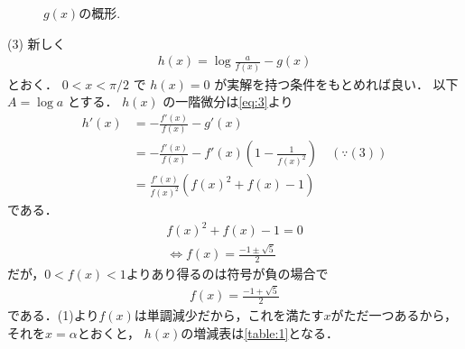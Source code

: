 \documentclass[a4paper,10pt]{ltjsarticle}
\begin{document}
\begin{multicols}{2}
  \begin{figure}[H]
    \centering
    \caption{$g(x)$の概形.}
    \label{fig:2}
  \end{figure}


  \vspace{10pt}
  (3)
  新しく
  \begin{align*}
    h(x) = \log \frac{a}{f(x)} - g(x)
  \end{align*}
  とおく．
  $0 < x < \pi/2$ で $h(x)=0$ が実解を持つ条件をもとめれば良い．
  以下 $A = \log a$ とする．
  $h(x)$ の一階微分は\cref{eq:3}より
  \begin{align*}
    h'(x)
     & = - \frac{f'(x)}{f(x)} - g'(x)                                                       \\
     & = - \frac{f'(x)}{f(x)} - f'(x)\left(1 - \frac{1}{f(x)^2}\right) \quad (\because (3)) \\
     & = \frac{f'(x)}{f(x)^2} (f(x)^2 + f(x)-1)
  \end{align*}
  である．
  \begin{align*}
    f(x)^2 + f(x) -1 = 0 \\
    \iff
    f(x) = \frac{-1 \pm \sqrt{5}}{2}
  \end{align*}
  だが，$0<f(x)<1$よりあり得るのは符号が負の場合で
  \begin{align*}
    f(x) = \frac{-1 + \sqrt{5}}{2}
  \end{align*}
  である．(1)より$f(x)$は単調減少だから，これを満たす$x$がただ一つあるから，
  それを$x=\alpha$とおくと，
  $h(x)$の増減表は\cref{table:1}となる．


\end{multicols}
\end{document}
